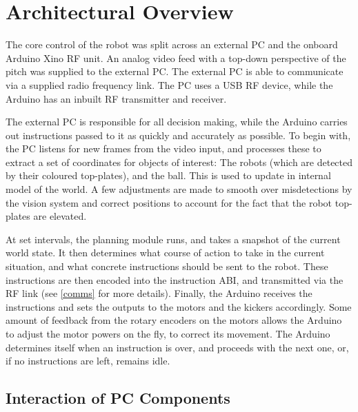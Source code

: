 \section{Architectural Overview}

The core control of the robot was split across an external PC and the onboard
Arduino Xino RF unit. An analog video feed with a top-down perspective of the
pitch was supplied to the external PC. The external PC is able to communicate
via a supplied radio frequency link. The PC uses a USB RF device, while the
Arduino has an inbuilt RF transmitter and receiver.

The external PC is responsible for all decision making, while the Arduino
carries out instructions passed to it as quickly and accurately as possible.
To begin with, the PC listens for new frames from the video input, and
processes these to extract a set of coordinates for objects of interest: The
robots (which are detected by their coloured top-plates), and the ball. This is
used to update in internal model of the world. A few adjustments are made to
smooth over misdetections by the vision system and correct positions to account
for the fact that the robot top-plates are elevated.

At set intervals, the planning module runs, and takes a snapshot of the current
world state. It then determines what course of action to take in the current
situation, and what concrete instructions should be sent to the robot. These
instructions are then encoded into the instruction ABI, and transmitted via the
RF link (see \cref{comms} for more details). Finally, the Arduino receives the
instructions and sets the outputs to the motors and the kickers accordingly.
Some amount of feedback from the rotary encoders on the motors allows the
Arduino to adjust the motor powers on the fly, to correct its movement. The
Arduino determines itself when an instruction is over, and proceeds with the
next one, or, if no instructions are left, remains idle.

\subsection{Interaction of PC Components}


